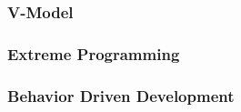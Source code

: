 \subsubsection{V-Model}

\subsubsection{Extreme Programming}

\subsubsection{Behavior Driven Development}
